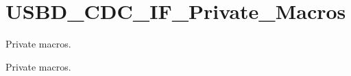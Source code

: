 \hypertarget{group__USBD__CDC__IF__Private__Macros}{}\section{U\+S\+B\+D\+\_\+\+C\+D\+C\+\_\+\+I\+F\+\_\+\+Private\+\_\+\+Macros}
\label{group__USBD__CDC__IF__Private__Macros}


Private macros.  


Private macros. 

